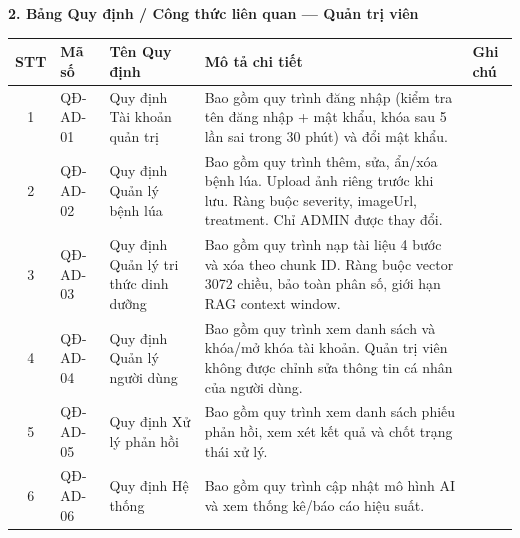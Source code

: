 \documentclass[12pt,a4paper]{article}
\begin{document}
\vspace{0.3cm}
\textbf{2. Bảng Quy định / Công thức liên quan --- Quản trị viên}

\begin{longtable}{|
        c|
        >{\raggedright\arraybackslash}p{1.8cm}|
        >{\raggedright\arraybackslash}p{3.4cm}|
        >{\raggedright\arraybackslash}p{6.4cm}|
        >{\raggedright\arraybackslash}p{1.4cm}|}
    \hline
    \rowcolor{headerblue}
    \textbf{STT} & \textbf{Mã số} & \textbf{Tên Quy định}                & \textbf{Mô tả chi tiết}                                                                                                                         & \textbf{Ghi chú} \\
    \hline
    \endhead
    1            & QĐ-AD-01       & Quy định Tài khoản quản trị          & Bao gồm quy trình đăng nhập (kiểm tra tên đăng nhập + mật khẩu, khóa sau 5 lần sai trong 30 phút) và đổi mật khẩu.                              &                  \\
    \hline
    2            & QĐ-AD-02       & Quy định Quản lý bệnh lúa            & Bao gồm quy trình thêm, sửa, ẩn/xóa bệnh lúa. Upload ảnh riêng trước khi lưu. Ràng buộc severity, imageUrl, treatment. Chỉ ADMIN được thay đổi. &                  \\
    \hline
    3            & QĐ-AD-03       & Quy định Quản lý tri thức dinh dưỡng & Bao gồm quy trình nạp tài liệu 4 bước và xóa theo chunk ID. Ràng buộc vector 3072 chiều, bảo toàn phân số, giới hạn RAG context window.         &                  \\
    \hline
    4            & QĐ-AD-04       & Quy định Quản lý người dùng          & Bao gồm quy trình xem danh sách và khóa/mở khóa tài khoản. Quản trị viên không được chỉnh sửa thông tin cá nhân của người dùng.                 &                  \\
    \hline
    5            & QĐ-AD-05       & Quy định Xử lý phản hồi              & Bao gồm quy trình xem danh sách phiếu phản hồi, xem xét kết quả và chốt trạng thái xử lý.                                                       &                  \\
    \hline
    6            & QĐ-AD-06       & Quy định Hệ thống                    & Bao gồm quy trình cập nhật mô hình AI và xem thống kê/báo cáo hiệu suất.                                                                        &                  \\
    \hline
\end{longtable}
\end{document}
